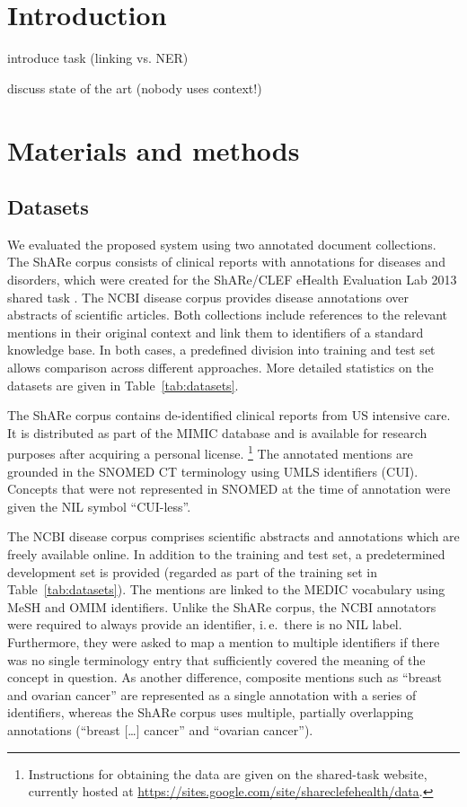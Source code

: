 \documentclass{bioinfo}
\newcommand{\url}[1]{\href{#1}{#1}}
\newcommand{\ie}{i.\,e.\ }
\begin{document}
\section{Introduction}

introduce task (linking vs. NER)

discuss state of the art (nobody uses context!)



\section{Materials and methods}

\subsection{Datasets}

We evaluated the proposed system using two annotated document collections.
The ShARe corpus consists of clinical reports with annotations for diseases and disorders, which were created for the ShARe/CLEF eHealth Evaluation Lab 2013 shared task \citep{pradhan-et-al:2013:CLEF}.
The NCBI disease corpus \citep{islamaj-dogan-et-al:2014} provides disease annotations over abstracts of scientific articles.
Both collections include references to the relevant mentions in their original context and link them to identifiers of a standard knowledge base.
In both cases, a predefined division into training and test set allows comparison across different approaches.
More detailed statistics on the datasets are given in Table~\ref{tab:datasets}.

The ShARe corpus contains de-identified clinical reports from US intensive care.
It is distributed as part of the MIMIC database  %
and is available for research purposes after acquiring a personal license.%
\footnote{Instructions for obtaining the data are given on the shared-task website, currently hosted at \url{https://sites.google.com/site/shareclefehealth/data}.}
The annotated mentions are grounded in the SNOMED CT terminology  %
using UMLS  %
identifiers (CUI).
Concepts that were not represented in SNOMED at the time of annotation were given the NIL symbol “CUI-less”.

The NCBI disease corpus comprises scientific abstracts and annotations which are freely available online.
In addition to the training and test set, a predetermined development set is provided (regarded as part of the training set in Table~\ref{tab:datasets}).
The mentions are linked to the MEDIC vocabulary  %
using MeSH  %
and OMIM  %
identifiers.
Unlike the ShARe corpus, the NCBI annotators were required to always provide an identifier, \ie there is no NIL label.
Furthermore, they were asked to map a mention to multiple identifiers if there was no single terminology entry that sufficiently covered the meaning of the concept in question.
As another difference, composite mentions such as “breast and ovarian cancer” are represented as a single annotation with a series of identifiers, whereas the ShARe corpus uses multiple, partially overlapping annotations (“breast [\dots] cancer” and “ovarian cancer”).
\end{document}
